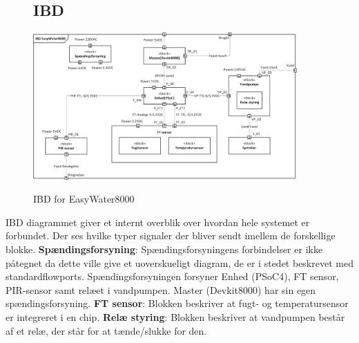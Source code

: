 \begin{figure}[H] \centering
\subsection{IBD}
{\includegraphics[width=0.9\textwidth]{filer/systemarkitektur/IBD}}
\caption{IBD for EasyWater8000}
\label{lab:ibd}
\raggedright
\end{figure}
IBD diagrammet giver et internt overblik over hvordan hele systemet er forbundet. Der ses hvilke typer signaler der bliver sendt imellem de forskellige blokke. \newline \newline
\textbf{Spændingsforsyning}: Spændingsforsyningens forbindelser er ikke påtegnet da dette ville give et uoverskueligt diagram, de er i stedet beskrevet med standardflowports. Spændingsforsyningen forsyner Enhed (PSoC4), FT sensor, PIR-sensor samt relæet i vandpumpen. Master (Devkit8000) har sin egen spændingsforsyning.  \newline \newline
\textbf{FT sensor}: Blokken beskriver at fugt- og temperatursensor er integreret i en chip. \newline \newline
\textbf{Relæ styring}: Blokken beskriver at vandpumpen består af et relæ, der står for at tænde/slukke for den. \newline \newline

